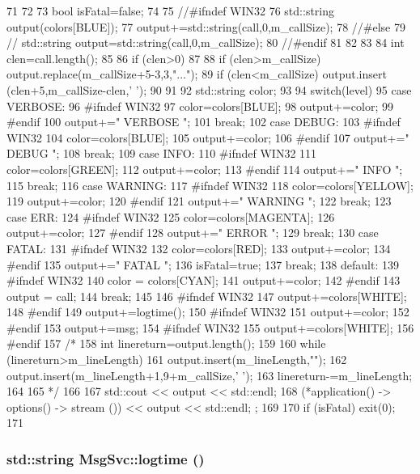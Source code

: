 \begin{DoxyCode}
71                                   {
72 
73   bool isFatal=false;   
74   
75   //#ifndef WIN32
76   std::string output(colors[BLUE]);
77   output+=std::string(call,0,m_callSize);
78   //#else
79   //  std::string output=std::string(call,0,m_callSize);
80   //#endif
81 
82 
83 
84   int clen=call.length();
85 
86   if (clen>0)
87   {
88     if (clen>m_callSize) output.replace(m_callSize+5-3,3,"...");
89     if (clen<m_callSize) output.insert (clen+5,m_callSize-clen,' ');
90   }
91   
92   std::string color;
93   
94   switch(level) {       
95   case VERBOSE:
96 #ifndef WIN32
97     color=colors[BLUE];
98     output+=color;
99 #endif
100     output+=" VERBOSE ";
101     break;
102   case DEBUG:
103 #ifndef WIN32
104     color=colors[BLUE];
105     output+=color;
106 #endif
107     output+=" DEBUG   ";
108     break;
109   case INFO:
110 #ifndef WIN32
111     color=colors[GREEN];
112     output+=color;
113 #endif
114     output+=" INFO    ";
115     break;
116   case WARNING:
117 #ifndef WIN32
118     color=colors[YELLOW];    
119     output+=color;
120 #endif
121     output+=" WARNING ";
122     break;
123   case ERR:
124 #ifndef WIN32
125     color=colors[MAGENTA];    
126     output+=color;
127 #endif
128     output+=" ERROR   ";
129     break;
130   case FATAL:
131 #ifndef WIN32
132     color=colors[RED];
133     output+=color;
134 #endif
135     output+=" FATAL   ";
136     isFatal=true;
137     break;
138   default:
139 #ifndef WIN32
140     color  = colors[CYAN];
141     output+=color;
142 #endif
143     output = call;
144     break;
145   }
146 #ifndef WIN32
147   output+=colors[WHITE];
148 #endif
149   output+=logtime();
150 #ifndef WIN32
151   output+=color;
152 #endif
153   output+=msg;
154 #ifndef WIN32
155   output+=colors[WHITE];
156 #endif
157   /*
158     int linereturn=output.length();
159 
160     while (linereturn>m_lineLength){
161     output.insert(m_lineLength,"\n");
162     output.insert(m_lineLength+1,9+m_callSize,' ');
163     linereturn-=m_lineLength;   
164     }
165   */
166   
167   std::cout << output << std::endl;
168   (*application() -> options() -> stream ()) << output << std::endl; ;
169 
170   if (isFatal) {exit(0);}
171 }
\end{DoxyCode}
\hypertarget{classMsgSvc_a74b20f11493ffbe27801bc1857fd079e}{
\subsubsection[{logtime}]{\setlength{\rightskip}{0pt plus 5cm}std::string MsgSvc::logtime ()}}
\label{classMsgSvc_a74b20f11493ffbe27801bc1857fd079e}


